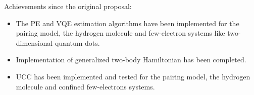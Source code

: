 \documentclass[11pt]{article}
\begin{document}



Achievements since the original proposal:
\begin{itemize}
    \item The PE and VQE estimation algorithms have been implemented for the pairing model, the hydrogen molecule and few-electron systems like two-dimensional quantum dots. 
    \item Implementation of generalized two-body Hamiltonian has been completed. 
    \item UCC has been implemented and tested for the pairing model, the hydrogen molecule and confined few-electrons systems.
\end{itemize}
\end{document}
